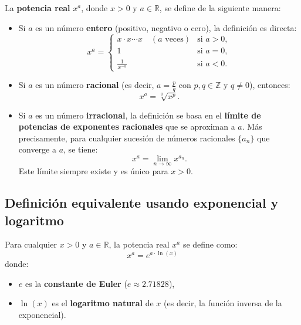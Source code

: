 \documentclass[12pt, a4paper]{article}
\theoremstyle{rioplatense}
\begin{document}
La \textbf{potencia real} \( x^a \), donde \( x > 0 \) y \( a \in \mathbb{R} \), se define de la siguiente manera:
\begin{itemize}
    \item Si \( a \) es un número \textbf{entero} (positivo, negativo o cero), la definición es directa:
    \[
    x^a =
    \begin{cases}
    x \cdot x \cdots x \quad (a \text{ veces}) & \text{si } a > 0, \\
    1 & \text{si } a = 0, \\
    \frac{1}{x^{-a}} & \text{si } a < 0.
    \end{cases}
    \]

    \item Si \( a \) es un número \textbf{racional} (es decir, \( a = \frac{p}{q} \) con \( p, q \in \mathbb{Z} \) y \( q \neq 0 \)), entonces:
    \[
    x^a = \sqrt[q]{x^p}.
    \]

    \item Si \( a \) es un número \textbf{irracional}, la definición se basa en el \textbf{límite de potencias de exponentes racionales} que se aproximan a \( a \). Más precisamente, para cualquier sucesión de números racionales \( \{a_n\} \) que converge a \( a \), se tiene:
    \[
    x^a = \lim_{n \to \infty} x^{a_n}.
    \]
    Este límite siempre existe y es único para \( x > 0 \).
\end{itemize}


\subsection{Definición equivalente usando exponencial y logaritmo}

Para cualquier \( x > 0 \) y \( a \in \mathbb{R} \), la potencia real \( x^a \) se define como:
\[
x^a = e^{a \cdot \ln(x)}
\]
donde:
\begin{itemize}
    \item \( e \) es la \textbf{constante de Euler} (\( e \approx 2.71828 \)),
    \item \( \ln(x) \) es el \textbf{logaritmo natural} de \( x \) (es decir, la función inversa de la exponencial).
\end{itemize}
\end{document}
